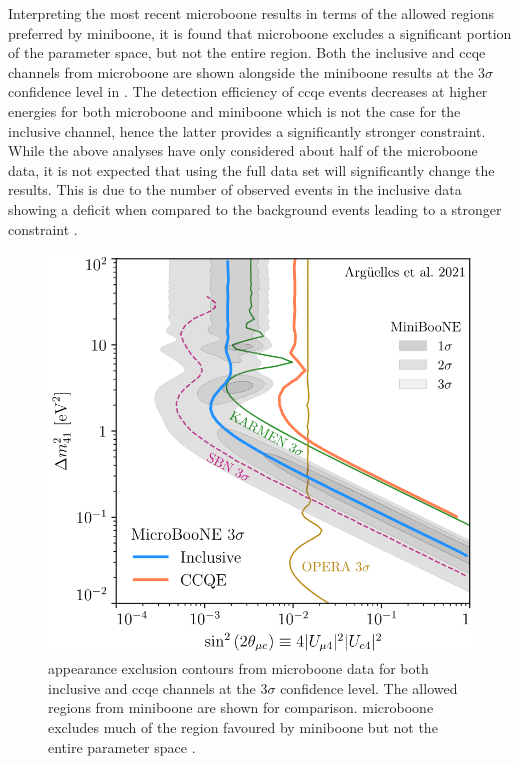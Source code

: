 Interpreting the most recent \gls{microboone} results in terms of the allowed regions preferred by \gls{miniboone}, it is found that \gls{microboone} excludes a significant portion of the parameter space, but not the entire region. Both the inclusive and \gls{ccqe} channels from \gls{microboone} are shown alongside the \gls{miniboone} results at the $3\sigma$ confidence level in . The detection efficiency of \gls{ccqe} events decreases at higher energies for both \gls{microboone} and \gls{miniboone} which is not the case for the inclusive channel, hence the latter provides a significantly stronger constraint. While the above analyses have only considered about half of the \gls{microboone} data, it is not expected that using the full data set will significantly change the results. This is due to the number of observed events in the inclusive data showing a deficit when compared to the background events leading to a stronger constraint \cite{MicroBooNE_and_the_nue_Interpretation_of_the_MiniBooNE_Low_Energy_Excess}.
\begin{figure}[h!]
    \centering
    \includegraphics[width = \largefigwidth]{figures-chap2/microboone_exclusion_contour.png}
    \caption[\nue appearance exclusion contours from \gls{microboone} compared with the results from \gls{miniboone}.]{\nue appearance exclusion contours from \gls{microboone} data for both inclusive and \gls{ccqe} channels at the $3\sigma$ confidence level. The allowed regions from \gls{miniboone} are shown for comparison. \gls{microboone} excludes much of the region favoured by \gls{miniboone} but not the entire parameter space \cite{MicroBooNE_and_the_nue_Interpretation_of_the_MiniBooNE_Low_Energy_Excess}.}
    \label{fig:microboone_exclusion_contour}
\end{figure}

